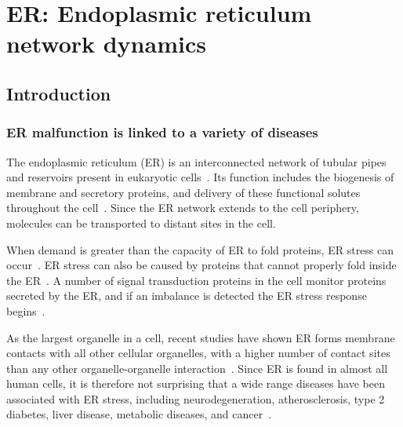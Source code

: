\chapter{ER: Endoplasmic reticulum network dynamics} \label{chap:ER}



\ifpdf
    \graphicspath{{Chapter5/Figs/Raster/}{Chapter5/Figs/PDF/}{Chapter5/Figs/}}
\else
    \graphicspath{{Chapter5/Figs/Vector/}{Chapter5/Figs/}}
\fi

%

\section{Introduction}
\subsection{ER malfunction is linked to a variety of diseases}
The endoplasmic reticulum (ER) is an interconnected network of tubular pipes and reservoirs present in eukaryotic cells~\cite{alberts2002molecular}.
Its function includes the biogenesis of membrane and secretory proteins, and delivery of these functional solutes throughout the cell~\cite{dyson1978cell}.
Since the ER network extends to the cell periphery, molecules can be transported to distant sites in the cell.

When demand is greater than the capacity of ER to fold proteins, ER stress can occur~\cite{oakes2015role}.
ER stress can also be caused by proteins that cannot properly fold inside the ER~\cite{rao2004misfolded}.
A number of signal transduction proteins in the cell monitor proteins secreted by the ER, and if an imbalance is detected the ER stress response begins~\cite{oakes2015role}.

As the largest organelle in a cell, recent studies have shown ER forms membrane contacts with all other cellular organelles, with a higher number of contact sites than any other organelle-organelle interaction~\cite{phillips2016structure, valm2017applying}.
Since ER is found in almost all human cells, it is therefore not surprising that a wide range diseases have been associated with ER stress, including neurodegeneration, atherosclerosis, type 2 diabetes, liver disease, metabolic diseases, and cancer~\cite{oakes2015role, ozcan2012role}.

